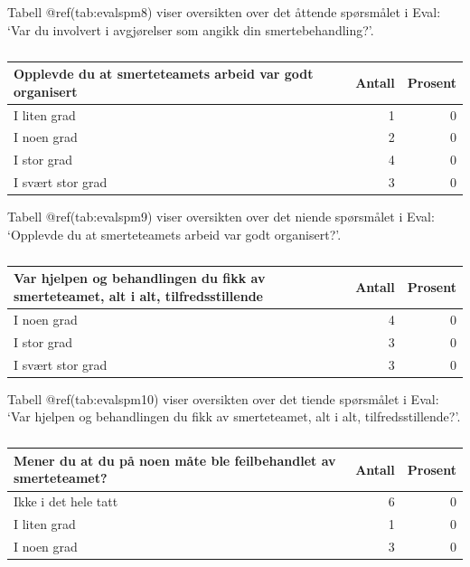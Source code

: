 \documentclass[
]{article}
\begin{document}
Tabell @ref(tab:evalspm8) viser oversikten over det åttende spørsmålet i
Eval: `Var du involvert i avgjørelser som angikk din smertebehandling?'.

\begin{table}

\caption{\label{tab:evalspm9}}
\centering
\begin{tabular}[t]{l|r|r}
\hline
Opplevde du at smerteteamets arbeid var godt organisert & Antall  & Prosent\\
\hline
I liten grad & 1 & 0\\
\hline
I noen grad & 2 & 0\\
\hline
I stor grad & 4 & 0\\
\hline
I svært stor grad & 3 & 0\\
\hline
\end{tabular}
\end{table}

Tabell @ref(tab:evalspm9) viser oversikten over det niende spørsmålet i
Eval: `Opplevde du at smerteteamets arbeid var godt organisert?'.

\begin{table}

\caption{\label{tab:evalspm10}}
\centering
\begin{tabular}[t]{l|r|r}
\hline
Var hjelpen og behandlingen du fikk av smerteteamet, alt i alt, tilfredsstillende & Antall  & Prosent\\
\hline
I noen grad & 4 & 0\\
\hline
I stor grad & 3 & 0\\
\hline
I svært stor grad & 3 & 0\\
\hline
\end{tabular}
\end{table}

Tabell @ref(tab:evalspm10) viser oversikten over det tiende spørsmålet i
Eval: `Var hjelpen og behandlingen du fikk av smerteteamet, alt i alt,
tilfredsstillende?'.

\begin{table}

\caption{\label{tab:evalspm11}}
\centering
\begin{tabular}[t]{l|r|r}
\hline
Mener du at du på noen måte ble feilbehandlet av smerteteamet? & Antall  & Prosent\\
\hline
Ikke i det hele tatt & 6 & 0\\
\hline
I liten grad & 1 & 0\\
\hline
I noen grad & 3 & 0\\
\hline
\end{tabular}
\end{table}
\end{document}
